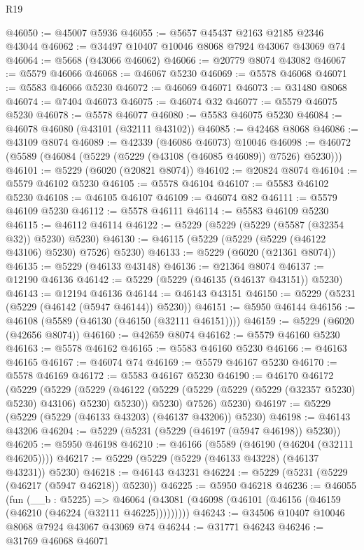 \begin{lexlean}{R19}
\begin{coremodule}
@46050 := @45007 @5936
@46055 := @5657 @45437 @2163 @2185 @2346 @43044
@46062 := @34497 @10407 @10046 @8068 @7924 @43067 @43069 @74
@46064 := @5668 (@43066 @46062)
@46066 := @20779 @8074 @43082
@46067 := @5579 @46066
@46068 := @46067 @5230
@46069 := @5578 @46068
@46071 := @5583 @46066 @5230
@46072 := @46069 @46071
@46073 := @31480 @8068
@46074 := @7404 @46073
@46075 := @46074 @32
@46077 := @5579 @46075 @5230
@46078 := @5578 @46077
@46080 := @5583 @46075 @5230
@46084 := @46078 @46080 (@43101 (@32111 @43102))
@46085 := @42468 @8068
@46086 := @43109 @8074
@46089 := @42339 (@46086 @46073) @10046
@46098 := @46072 (@5589 (@46084 (@5229 (@5229 (@43108 (@46085 @46089)) @7526) @5230)))
@46101 := @5229 (@6020 (@20821 @8074))
@46102 := @20824 @8074
@46104 := @5579 @46102 @5230
@46105 := @5578 @46104
@46107 := @5583 @46102 @5230
@46108 := @46105 @46107
@46109 := @46074 @82
@46111 := @5579 @46109 @5230
@46112 := @5578 @46111
@46114 := @5583 @46109 @5230
@46115 := @46112 @46114
@46122 := @5229 (@5229 (@5229 (@5587 (@32354 @32)) @5230) @5230)
@46130 := @46115 (@5229 (@5229 (@5229 (@46122 @43106) @5230) @7526) @5230)
@46133 := @5229 (@6020 (@21361 @8074))
@46135 := @5229 (@46133 @43148)
@46136 := @21364 @8074
@46137 := @12190 @46136
@46142 := @5229 (@5229 (@46135 (@46137 @43151)) @5230)
@46143 := @12194 @46136
@46144 := @46143 @43151
@46150 := @5229 (@5231 (@5229 (@46142 (@5947 @46144)) @5230))
@46151 := @5950 @46144
@46156 := @46108 (@5589 (@46130 (@46150 (@32111 @46151))))
@46159 := @5229 (@6020 (@42656 @8074))
@46160 := @42659 @8074
@46162 := @5579 @46160 @5230
@46163 := @5578 @46162
@46165 := @5583 @46160 @5230
@46166 := @46163 @46165
@46167 := @46074 @74
@46169 := @5579 @46167 @5230
@46170 := @5578 @46169
@46172 := @5583 @46167 @5230
@46190 := @46170
    @46172
    (@5229
      (@5229
        (@5229
          (@46122 (@5229 (@5229 (@5229 (@5229 (@32357 @5230) @5230) @43106) @5230) @5230))
          @5230)
        @7526)
      @5230)
@46197 := @5229 (@5229 (@5229 (@46133 @43203) (@46137 @43206)) @5230)
@46198 := @46143 @43206
@46204 := @5229 (@5231 (@5229 (@46197 (@5947 @46198)) @5230))
@46205 := @5950 @46198
@46210 := @46166 (@5589 (@46190 (@46204 (@32111 @46205))))
@46217 := @5229 (@5229 (@5229 (@46133 @43228) (@46137 @43231)) @5230)
@46218 := @46143 @43231
@46224 := @5229 (@5231 (@5229 (@46217 (@5947 @46218)) @5230))
@46225 := @5950 @46218
@46236 := @46055
    (fun (__b : @5225) =>
    @46064 (@43081 (@46098 (@46101 (@46156 (@46159 (@46210 (@46224 (@32111 @46225)))))))))
@46243 := @34506 @10407 @10046 @8068 @7924 @43067 @43069 @74
@46244 := @31771 @46243
@46246 := @31769 @46068 @46071

\end{coremodule}
\end{lexlean}
